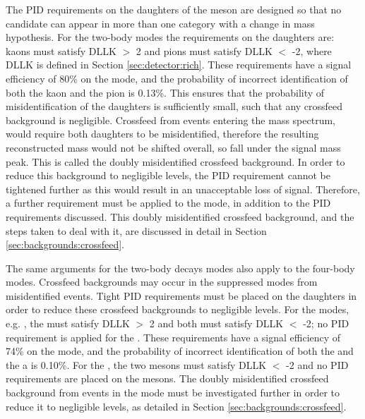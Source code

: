The PID requirements on the daughters of the \Dz meson are designed so that no  candidate can appear in more than one category with a change in mass hypothesis. For the two-body \Dz modes the requirements on the \Dz daughters are: kaons must satisfy DLLK $>$ 2 and pions must satisfy DLLK $<$ -2, where DLLK is defined in Section \ref{sec:detector:rich}. These requirements have a signal efficiency of 80\% on the \kpi mode, and the probability of incorrect identification of both the kaon and the pion is 0.13\%. This ensures that the probability of misidentification of the \Dz daughters is sufficiently small, such that any crossfeed background is negligible. Crossfeed from \kpi events entering the \pik mass spectrum, would require both \Dz daughters to be misidentified, therefore the resulting reconstructed \Dz mass would not be shifted overall, so fall under the signal \Dz mass peak. This is called the doubly misidentified crossfeed background. In order to reduce this background to negligible levels, the PID requirement cannot be tightened further as this would result in an unacceptable loss of signal. Therefore, a further requirement must be applied to the \pik mode, in addition to the PID requirements discussed. This doubly misidentified crossfeed background, and the steps taken to deal with it, are discussed in detail in Section \ref{sec:backgrounds:crossfeed}.

The same arguments for the two-body \Dz decays modes also apply to the four-body modes. Crossfeed backgrounds may occur in the suppressed \Dz modes from misidentified \kpipipi events. Tight PID requirements must be placed on the \Dz daughters in order to reduce these crossfeed backgrounds to negligible levels. For the \decay{\Dz}{\Kmp\pipm\pimp\pipm} modes, e.g. \decay{\Dz}{\Km\pip\pim\pip}, the \Km must satisfy DLLK $>$ 2 and both \pip must satisfy DLLK $<$ -2; no PID requirement is applied for the \pim. These requirements have a signal efficiency of 74\% on the \kpipipi mode, and the probability of incorrect identification of both the \Km and the a \pip is 0.10\%. For the \decay{\Dz}{\pip\pim\pip\pim}, the two \pip mesons must satisfy DLLK $<$ -2 and no PID requirements are placed on the \pim mesons. The doubly misidentified crossfeed background from \kpipipi events in the \pikpipi mode must be investigated further in order to reduce it to negligible levels, as detailed in Section \ref{sec:backgrounds:crossfeed}.

